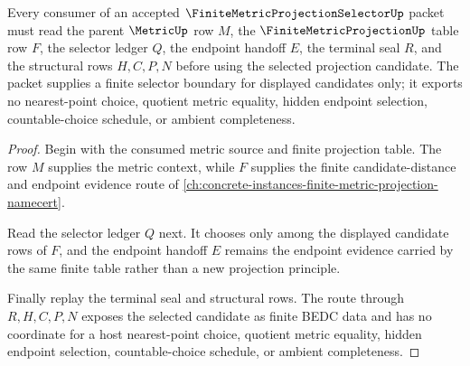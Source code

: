 \begin{theorem}
\label{thm:finite-metric-projection-selector-nonescape}
Every consumer of an accepted $\FiniteMetricProjectionSelectorUp$ packet must read the parent $\MetricUp$ row $M$, the $\FiniteMetricProjectionUp$ table row $F$, the selector ledger $Q$, the endpoint handoff $E$, the terminal seal $R$, and the structural rows $H,C,P,N$ before using the selected projection candidate. The packet supplies a finite selector boundary for displayed candidates only; it exports no nearest-point choice, quotient metric equality, hidden endpoint selection, countable-choice schedule, or ambient completeness.
\end{theorem}
\begin{proof}
Begin with the consumed metric source and finite projection table. The row $M$ supplies the metric context, while $F$ supplies the finite candidate-distance and endpoint evidence route of \autoref{ch:concrete-instances-finite-metric-projection-namecert}.

Read the selector ledger $Q$ next. It chooses only among the displayed candidate rows of $F$, and the endpoint handoff $E$ remains the endpoint evidence carried by the same finite table rather than a new projection principle.

Finally replay the terminal seal and structural rows. The route through $R,H,C,P,N$ exposes the selected candidate as finite BEDC data and has no coordinate for a host nearest-point choice, quotient metric equality, hidden endpoint selection, countable-choice schedule, or ambient completeness.
\end{proof}



